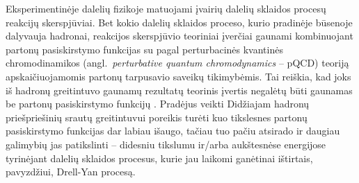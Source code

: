\documentclass[a4paper, 12pt]{article}
\newlength\q
\begin{document}
Eksperimentinėje dalelių fizikoje matuojami įvairių dalelių sklaidos procesų reakcijų skerspjūviai. Bet kokio dalelių sklaidos proceso, kurio pradinėje būsenoje dalyvauja hadronai, reakcijos skerspjūvio teoriniai įverčiai gaunami kombinuojant partonų pasiskirstymo funkcijas su pagal perturbacinės kvantinės chromodinamikos (angl.\ \textit{perturbative quantum chromodynamics} -- pQCD) teoriją apskaičiuojamomis partonų tarpusavio saveikų tikimybėmis. Tai reiškia, kad joks iš hadronų greitintuvo gaunamų rezultatų teorinis įvertis negalėtų būti gaunamas be partonų pasiskirstymo funkcijų \cite{PDFs}. Pradėjus veikti Didžiajam hadronų priešpriešinių srautų greitintuvui poreikis turėti kuo tikslesnes partonų pasiskirstymo funkcijas dar labiau išaugo, tačiau tuo pačiu atsirado ir daugiau galimybių jas patikslinti -- didesniu tikslumu ir/arba aukštesnėse energijose tyrinėjant dalelių sklaidos procesus, kurie jau laikomi ganėtinai ištirtais, pavyzdžiui, Drell-Yan procesą.
\end{document}

